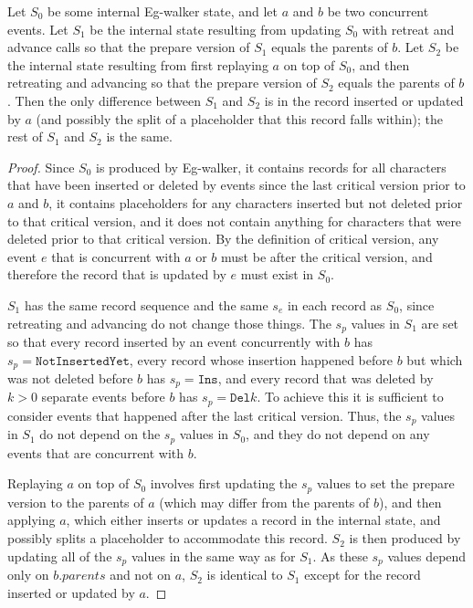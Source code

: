 \documentclass[sigplan,10pt]{acmart}
\newcommand{\algname}{Eg-walker\xspace}
\begin{document}
\begin{lemma}\label{lemma-prepare-state}
  Let $S_0$ be some internal \algname state, and let $a$ and $b$ be two concurrent events.
  Let $S_1$ be the internal state resulting from updating $S_0$ with retreat and advance calls so that the prepare version of $S_1$ equals the parents of $b$.
  Let $S_2$ be the internal state resulting from first replaying $a$ on top of $S_0$, and then retreating and advancing so that the prepare version of $S_2$ equals the parents of $b$.
  Then the only difference between $S_1$ and $S_2$ is in the record inserted or updated by $a$ (and possibly the split of a placeholder that this record falls within); the rest of $S_1$ and $S_2$ is the same.
\end{lemma}
\begin{proof}
  Since $S_0$ is produced by \algname, it contains records for all characters that have been inserted or deleted by events since the last critical version prior to $a$ and $b$, it contains placeholders for any characters inserted but not deleted prior to that critical version, and it does not contain anything for characters that were deleted prior to that critical version.
  By the definition of critical version, any event $e$ that is concurrent with $a$ or $b$ must be after the critical version, and therefore the record that is updated by $e$ must exist in $S_0$.

  $S_1$ has the same record sequence and the same $s_e$ in each record as $S_0$, since retreating and advancing do not change those things.
  The $s_p$ values in $S_1$ are set so that every record inserted by an event concurrently with $b$ has $s_p = \texttt{NotInsertedYet}$, every record whose insertion happened before $b$ but which was not deleted before $b$ has $s_p = \texttt{Ins}$, and every record that was deleted by $k>0$ separate events before $b$ has $s_p = \texttt{Del} k$.
  To achieve this it is sufficient to consider events that happened after the last critical version.
  Thus, the $s_p$ values in $S_1$ do not depend on the $s_p$ values in $S_0$, and they do not depend on any events that are concurrent with $b$.

  Replaying $a$ on top of $S_0$ involves first updating the $s_p$ values to set the prepare version to the parents of $a$ (which may differ from the parents of $b$), and then applying $a$, which either inserts or updates a record in the internal state, and possibly splits a placeholder to accommodate this record.
  $S_2$ is then produced by updating all of the $s_p$ values in the same way as for $S_1$.
  As these $s_p$ values depend only on $b.\mathit{parents}$ and not on $a$, $S_2$ is identical to $S_1$ except for the record inserted or updated by $a$.
\end{proof}
\end{document}
